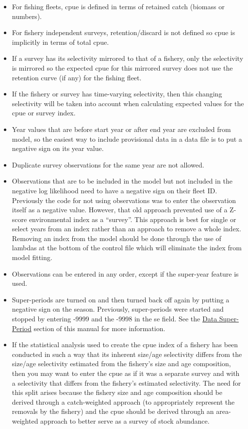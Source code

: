 \begin{itemize}
	\item For fishing fleets, \gls{cpue} is defined in terms of retained catch (biomass or numbers).
	\item For fishery independent surveys, retention/discard is not defined so \gls{cpue} is implicitly in terms of total \gls{cpue}.
	\item If a survey has its selectivity mirrored to that of a fishery, only the selectivity is mirrored so the expected \gls{cpue} for this mirrored survey does not use the retention curve (if any) for the fishing fleet.
	\item If the fishery or survey has time-varying selectivity, then this changing selectivity will be taken into account when calculating expected values for the \gls{cpue} or survey index.
	\item Year values that are before start year or after end year are excluded from model, so the easiest way to include provisional data in a data file is to put a negative sign on its year value.
	\item Duplicate survey observations for the same year are not allowed.
	\item Observations that are to be included in the model but not included in the negative log likelihood need to have a negative sign on their fleet ID. Previously the code for not using observations was to enter the observation itself as a negative value. However, that old approach prevented use of a Z-score environmental index as a ``survey''. This approach is best for single or select years from an index rather than an approach to remove a whole index. Removing an index from the model should be done through the use of lambdas at the bottom of the control file which will eliminate the index from model fitting. 
	\item Observations can be entered in any order, except if the super-year feature is used.
	\item Super-periods are turned on and then turned back off again by putting a negative sign on the season. Previously, super-periods were started and stopped by entering -9999 and the -9998 in the \gls{se} field. See the \hyperlink{SuperPeriod}{Data Super-Period} section of this manual for more information.
	\item If the statistical analysis used to create the \gls{cpue} index of a fishery has been conducted in such a way that its inherent size/age selectivity differs from the size/age selectivity estimated from the fishery's size and age composition, then you may want to enter the \gls{cpue} as if it was a separate survey and with a selectivity that differs from the fishery's estimated selectivity. The need for this split arises because the fishery size and age composition should be derived through a catch-weighted approach (to appropriately represent the removals by the fishery) and the \gls{cpue} should be derived through an area-weighted approach to better serve as a survey of stock abundance.
\end{itemize}

